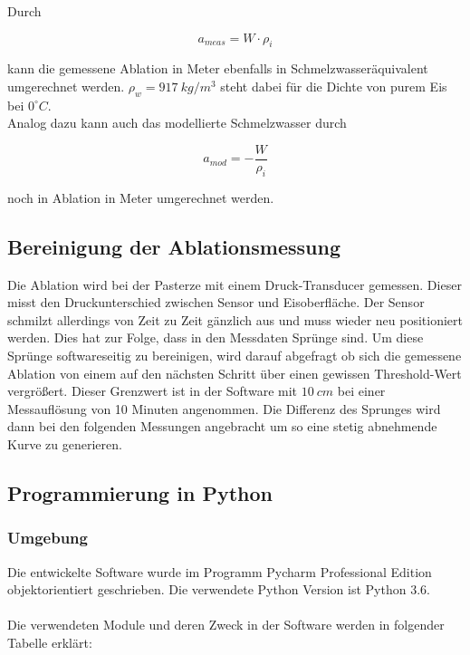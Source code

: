 \documentclass[11pt,a4paper]{article}
\begin{document}
Durch 

\begin{equation}
a_{meas} = W \cdot \rho_{i}
\end{equation}


kann die gemessene Ablation in Meter ebenfalls in Schmelzwasseräquivalent umgerechnet werden. $\rho_{w}=917~kg/m^3$ steht dabei für die Dichte von purem Eis bei $0^\circ C$.\\

Analog dazu kann auch das modellierte Schmelzwasser durch

\begin{equation}
a_{mod} = -\frac{W}{\rho_{i}}
\end{equation}

noch in Ablation in Meter umgerechnet werden.

\subsection{Bereinigung der Ablationsmessung}
Die Ablation wird bei der Pasterze mit einem Druck-Transducer gemessen. Dieser misst den Druckunterschied zwischen Sensor und Eisoberfläche. Der Sensor schmilzt allerdings von Zeit zu Zeit gänzlich aus und muss wieder neu positioniert werden. Dies hat zur Folge, dass in den Messdaten Sprünge sind. Um diese Sprünge softwareseitig zu bereinigen, wird darauf abgefragt ob sich die gemessene Ablation von einem auf den nächsten Schritt über einen gewissen Threshold-Wert vergrößert. Dieser Grenzwert ist in der Software mit $10~cm$ bei einer Messauflösung von 10 Minuten angenommen. Die Differenz des Sprunges wird dann bei den folgenden Messungen angebracht um so eine stetig abnehmende Kurve zu generieren.



\subsection{Programmierung in Python}
\subsubsection{Umgebung}

Die entwickelte Software wurde im Programm Pycharm Professional Edition objektorientiert geschrieben. Die verwendete Python Version ist Python 3.6.\\\\
Die verwendeten Module und deren Zweck in der Software werden in folgender Tabelle erklärt:
\end{document}

